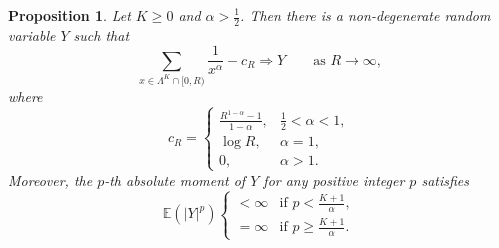 \documentclass[11pt,twoside,a4paper,reqno]{amsart}
\newtheorem{proposition}[theorem]{Proposition}
\newcommand{\E}{\mathbb{E}}
\begin{document}
\begin{proposition}\label{PPPconprop}
Let $K \geq 0$ and $\alpha>\frac{1}{2}$. Then there is a
non-degenerate random variable $Y$ such that
$$\sum_{x\in\Lambda^K\cap[0,R)}\frac1{x^\alpha}-c_R\Rightarrow Y
\qquad\text{as }R\to\infty,$$
where
$$
c_R=\begin{cases}
\displaystyle \frac{R^{1-\alpha}-1}{1-\alpha},
& \frac12<\alpha<1,\\[1.2ex]
\log R,
& \alpha=1,\\[0.8ex]
0,
& \alpha>1.
\end{cases}
$$
Moreover, the $p$-th absolute moment of $Y$ for any positive integer $p$ satisfies
\begin{equation*}
\E(|Y|^p)
\begin{cases}
<\infty & \text{if } p<\frac{K+1}{\alpha},\\
=\infty & \text{if } p\geq \frac{K+1}{\alpha}.
\end{cases}
\end{equation*}
\end{proposition}
\end{document}
